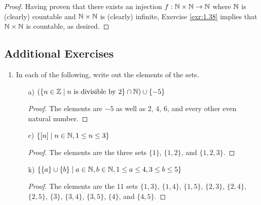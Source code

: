 \documentclass[../main.tex]{subfiles}
\begin{document}
\begin{exercise}
\begin{proof}
        Having proven that there exists an injection $f:\mathbb{N}\times\mathbb{N}\to\mathbb{N}$ where $\mathbb{N}$ is (clearly) countable and $\mathbb{N}\times\mathbb{N}$ is (clearly) infinite, Exercise \ref{exr:1.38} implies that $\mathbb{N}\times\mathbb{N}$ is countable, as desired.
    \end{proof}
\end{exercise}

\subsection*{Additional Exercises}
\begin{enumerate}
    \item {}In each of the following, write out the elements of the sets.
    \begin{enumerate}
        \item[a)] $(\{n\in\mathbb{Z}\mid n\text{ is divisible by }2\}\cap\mathbb{N})\cup\{-5\}$
        \begin{proof}
            The elements are $-5$ as well as 2, 4, 6, and every other even natural number.
        \end{proof}
        \item[c)] $\{[n]\mid n\in\mathbb{N},1\leq n\leq 3\}$
        \begin{proof}
            The elements are the three sets $\{1\}$, $\{1,2\}$, and $\{1,2,3\}$.
        \end{proof}
        \item[k)] $\{\{a\}\cup\{b\}\mid a\in\mathbb{N},b\in\mathbb{N},1\leq a\leq 4,3\leq b\leq 5\}$
        \begin{proof}
            The elements are the 11 sets $\{1,3\}$, $\{1,4\}$, $\{1,5\}$, $\{2,3\}$, $\{2,4\}$, $\{2,5\}$, $\{3\}$, $\{3,4\}$, $\{3,5\}$, $\{4\}$, and $\{4,5\}$.
        \end{proof}
    \end{enumerate}
\end{enumerate}
\end{document}
